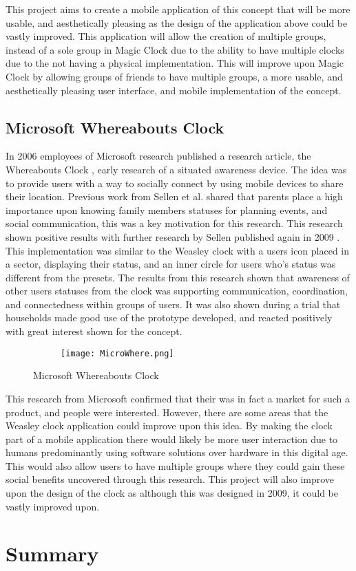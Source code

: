 This project aims to create a mobile application of this concept that will be more usable, and aesthetically pleasing as the design of the application above could be vastly improved. This application will allow the creation of multiple groups, instead of a sole group in Magic Clock due to the ability to have multiple clocks due to the not having a physical implementation. This will improve upon Magic Clock by allowing groups of friends to have multiple groups, a more usable, and aesthetically pleasing user interface, and mobile implementation of the concept.

\subsection{Microsoft Whereabouts Clock}

In 2006 employees of Microsoft research published a research article, the Whereabouts Clock \cite{micrWher}, early research of a situated awareness device. The idea was to provide users with a way to socially connect by using mobile devices to share their location. Previous work from Sellen et al. \cite{sellen} shared that parents place a high importance upon knowing family members statuses for planning events, and social communication, this was a key motivation for this research. This research shown positive results with further research by Sellen published again in 2009 \cite{sellen2009}. This implementation was similar to the Weasley clock with a users icon placed in a sector, displaying their status, and an inner circle for users who's status was different from the presets. The results from this research shown that awareness of other users statuses from the clock was supporting communication, coordination, and connectedness within groups of users. It was also shown during a trial that households made good use of the prototype developed, and reacted positively with great interest shown for the concept.

\begin{figure}[!htbp]
    \centering
    \begin{subfigure}[b]{0.5\textwidth}
        {\texttt{[image: MicroWhere.png]}}
    \end{subfigure}
    \caption{Microsoft Whereabouts Clock}
    \label{fig:microWhere}
\end{figure}
\FloatBarrier

This research from Microsoft confirmed that their was in fact a market for such a product, and people were interested. However, there are some areas that the Weasley clock application could improve upon this idea. By making the clock part of a mobile application there would likely be more user interaction due to humans predominantly using software solutions over hardware in this digital age. This would also allow users to have multiple groups where they could gain these social benefits uncovered through this research. This project will also improve upon the design of the clock as although this was designed in 2009, it could be vastly improved upon. 



\section{Summary}